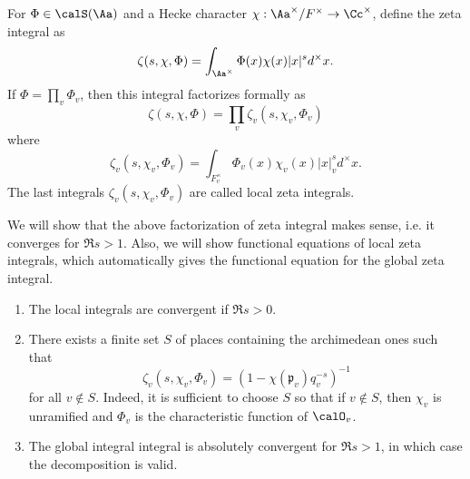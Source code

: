 \begin{definition}
For $\Phi\in \calS(\Aa)$ and a Hecke character $\chi:\Aa^{\times}/F^{\times} \to \Cc^{\times}$, define the zeta integral as
$$
\zeta(s, \chi, \Phi) = \int_{\Aa^{\times}} \Phi(x) \chi(x) |x|^{s} d^{\times}x. 
$$
If $\Phi = \prod_{v}\Phi_{v}$, then this integral factorizes formally as
$$
\zeta(s, \chi, \Phi) = \prod_{v} \zeta_{v}(s, \chi_{v}, \Phi_{v})
$$
where 
$$
\zeta_{v}(s, \chi_{v}, \Phi_{v}) = \int_{F_{v}^{\times}} \Phi_{v}(x)\chi_{v}(x)|x|_{v}^{s}d^{\times}x.
$$
The last integrals $\zeta_{v}(s, \chi_{v}, \Phi_{v})$ are called local zeta integrals. 
\end{definition}
We will show that the above factorization of zeta integral makes sense, i.e. it converges for $\Re s >1$. 
Also, we will show functional equations of local zeta integrals, which automatically gives the functional equation for the global zeta integral. 
\begin{proposition}
\begin{enumerate}
\item The local integrals are convergent if $\Re s >0$. 
\item There exists a finite set $S$ of places containing the archimedean ones such that 
$$
\zeta_{v}(s, \chi_{v}, \Phi_{v}) = (1-\chi(\mathfrak{p}_{v}) q_{v}^{-s})^{-1}
$$
for all $v\not\in S$. 
Indeed, it is sufficient to choose $S$ so that if $v\not\in S$, then $\chi_{v}$ is unramified and $\Phi_{v}$ is the characteristic function of $\calO_{v}$. 
\item The global integral integral is absolutely convergent for $\Re s >1$, in which case the decomposition is valid. 
\end{enumerate}
\end{proposition}
